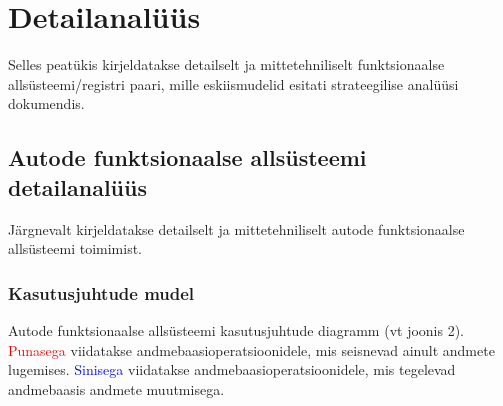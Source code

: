 
\newcommand{\useDash}{\renewcommand{\labelitemi}{\textendash}}

\chapter{Detailanalüüs}
Selles peatükis kirjeldatakse detailselt ja mittetehniliselt funktsionaalse allsüsteemi/registri paari, mille eskiismudelid esitati strateegilise analüüsi dokumendis.

\section{Autode funktsionaalse allsüsteemi detailanalüüs}
Järgnevalt kirjeldatakse detailselt ja mittetehniliselt autode funktsionaalse allsüsteemi toimimist.

\subsection{Kasutusjuhtude mudel}
Autode funktsionaalse allsüsteemi kasutusjuhtude diagramm (vt joonis 2).  \vspace{\pVert} \\ \hfill
\textcolor{red}{Punasega} viidatakse andmebaasioperatsioonidele, mis seisnevad ainult andmete lugemises. \textcolor{blue}{Sinisega} viidatakse andmebaasioperatsioonidele, mis tegelevad andmebaasis andmete muutmisega.

